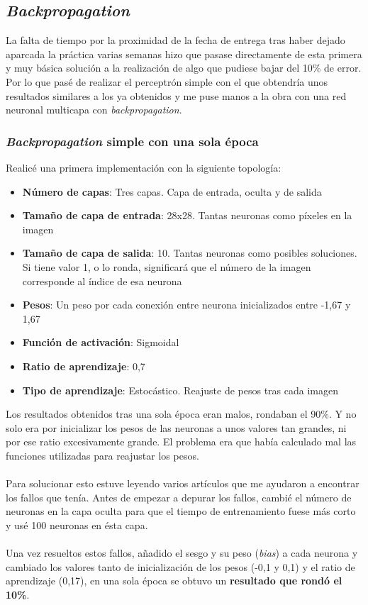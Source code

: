 \subsection{\textit{Backpropagation}}

La falta de tiempo por la proximidad de la fecha de entrega tras haber dejado aparcada la práctica varias semanas hizo que pasase directamente de esta primera y muy básica solución a la realización de algo que pudiese bajar del 10\% de error. Por lo que pasé de realizar el perceptrón simple con el que obtendría unos resultados similares a los ya obtenidos y me puse manos a la obra con una red neuronal multicapa con \textit{backpropagation}.

\subsubsection{\textit{Backpropagation} simple con una sola época}

Realicé una primera implementación con la siguiente topología:
\begin{itemize}
	\item \textbf{Número de capas}: Tres capas. Capa de entrada, oculta y de salida
	\item \textbf{Tamaño de capa de entrada}: 28x28. Tantas neuronas como píxeles en la imagen
	\item \textbf{Tamaño de capa de salida}: 10. Tantas neuronas como posibles soluciones. Si tiene valor 1, o lo ronda, significará que el número de la imagen corresponde al índice de esa neurona
	\item \textbf{Pesos}: Un peso por cada conexión entre neurona inicializados entre -1,67 y 1,67
	\item \textbf{Función de activación}: Sigmoidal
	\item \textbf{Ratio de aprendizaje}: 0,7
	\item \textbf{Tipo de aprendizaje}: Estocástico. Reajuste de pesos tras cada imagen
\end{itemize}
Los resultados obtenidos tras una sola época eran malos, rondaban el 90\%. Y no solo era por inicializar los pesos de las neuronas a unos valores tan grandes, ni por ese ratio excesivamente grande. El problema era que había calculado mal las funciones utilizadas para reajustar los pesos.
\\ \\
Para solucionar esto estuve leyendo varios artículos \cite{backpropagation-de} \cite{backpropagation-au} que me ayudaron a encontrar los fallos que tenía. Antes de empezar a depurar los fallos, cambié el número de neuronas en la capa oculta para que el tiempo de entrenamiento fuese más corto y usé 100 neuronas en ésta capa.
\\ \\
Una vez resueltos estos fallos, añadido el sesgo y su peso (\textit{bias}) a cada neurona y cambiado los valores tanto de inicialización de los pesos (-0,1 y 0,1) y el ratio de aprendizaje (0,17), en una sola época se obtuvo un \textbf{resultado que rondó el 10\%}.

